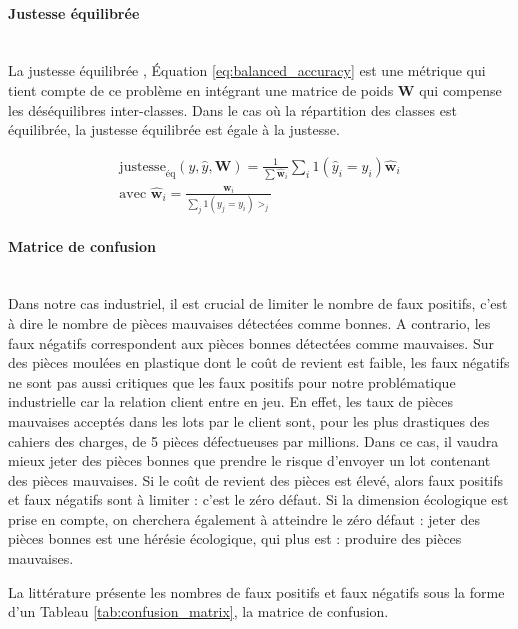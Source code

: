 \paragraph{Justesse équilibrée}\mbox{} \\
La justesse équilibrée \cite{brodersen_balanced_2010, mosley_balanced_2013}, Équation \ref{eq:balanced_accuracy} est une métrique qui tient compte de ce problème en intégrant une matrice de poids $\mathbf{W}$ qui compense les déséquilibres inter-classes.
Dans le cas où la répartition des classes est équilibrée, la justesse équilibrée est égale à la justesse.

\begin{equation} \label{eq:balanced_accuracy}
\begin{split}
\text{justesse}_{\text{éq}}(y, \hat{y}, \mathbf{W})=\frac{1}{\sum \hat{\mathbf{w}}_{i}} \sum_{i} 1\left(\hat{y}_{i}=y_{i}\right) \hat{\mathbf{w}}_{i}
\\
\text{avec } \hat{\mathbf{w}}_{i}=\frac{\mathbf{w}_{i}}{\sum_{j} 1\left(y_{j}=y_{i}\right) >_{j}}
\end{split}
\end{equation}

\paragraph{Matrice de confusion}\mbox{} \\
Dans notre cas industriel, il est crucial de limiter le nombre de faux positifs, c'est à dire le nombre de pièces mauvaises détectées comme bonnes.
A contrario, les faux négatifs correspondent aux pièces bonnes détectées comme mauvaises.
Sur des pièces moulées en plastique dont le coût de revient est faible, les faux négatifs ne sont pas aussi critiques que les faux positifs pour notre problématique industrielle car la relation client entre en jeu.
En effet, les taux de pièces mauvaises acceptés dans les lots par le client sont, pour les plus drastiques des cahiers des charges, de 5 pièces défectueuses par millions.
Dans ce cas, il vaudra mieux jeter des pièces bonnes que prendre le risque d'envoyer un lot contenant des pièces mauvaises.
Si le coût de revient des pièces est élevé, alors faux positifs et faux négatifs sont à limiter : c'est le zéro défaut.
Si la dimension écologique est prise en compte, on cherchera également à atteindre le zéro défaut : jeter des pièces bonnes est une hérésie écologique, qui plus est : produire des pièces mauvaises.

La littérature présente les nombres de faux positifs et faux négatifs sous la forme d'un Tableau \ref{tab:confusion_matrix}, la matrice de confusion.

